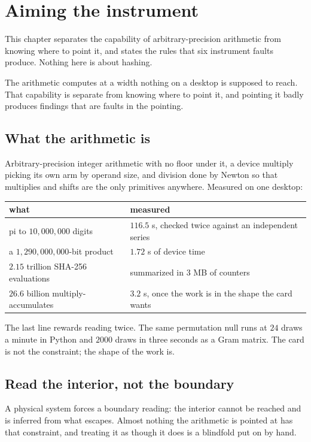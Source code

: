 \chapter{Aiming the instrument}

This chapter separates the capability of arbitrary-precision arithmetic from knowing where to point it, and states the rules that six instrument faults produce. Nothing here is about hashing.

The arithmetic computes at a width nothing on a desktop is supposed to reach. That capability is separate from knowing where to point it, and pointing it badly produces findings that are faults in the pointing.

\section{What the arithmetic is}

Arbitrary-precision integer arithmetic with no floor under it, a device multiply picking its own arm by operand size, and division done by Newton so that multiplies and shifts are the only primitives anywhere. Measured on one desktop:

\begin{center}
\begin{tabular}{@{}ll@{}}
\toprule
what & measured \\
\midrule
pi to \(10{,}000{,}000\) digits & \(116.5\) s, checked twice against an independent series \\
a \(1{,}290{,}000{,}000\)-bit product & \(1.72\) s of device time \\
\(2.15\) trillion SHA-256 evaluations & summarized in \(3\) MB of counters \\
\(26.6\) billion multiply-accumulates & \(3.2\) s, once the work is in the shape the card wants \\
\bottomrule
\end{tabular}
\end{center}

The last line rewards reading twice. The same permutation null runs at \(24\) draws a minute in Python and \(2000\) draws in three seconds as a Gram matrix. The card is not the constraint; the shape of the work is.

\section{Read the interior, not the boundary}

A physical system forces a boundary reading: the interior cannot be reached and is inferred from what escapes. Almost nothing the arithmetic is pointed at has that constraint, and treating it as though it does is a blindfold put on by hand.


